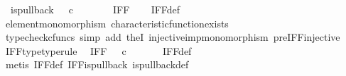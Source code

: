 \begin{isabellebody}
\ \ {\isachardoublequoteopen}is{\isacharunderscore}{\kern0pt}pullback\ {\isacharparenleft}{\kern0pt}{\isasymone}{\isasymCoprod}{\isasymone}{\isacharparenright}{\kern0pt}\ {\isasymone}\ {\isacharparenleft}{\kern0pt}{\isasymOmega}{\isasymtimes}\isactrlsub c{\isasymOmega}{\isacharparenright}{\kern0pt}\ {\isasymOmega}\ {\isacharparenleft}{\kern0pt}{\isasymbeta}\isactrlbsub {\isacharparenleft}{\kern0pt}{\isasymone}{\isasymCoprod}{\isasymone}{\isacharparenright}{\kern0pt}\isactrlesub {\isacharparenright}{\kern0pt}\ {\isasymt}\ {\isacharparenleft}{\kern0pt}{\isasymlangle}{\isasymt}{\isacharcomma}{\kern0pt}\ {\isasymt}{\isasymrangle}\ {\isasymamalg}{\isasymlangle}{\isasymf}{\isacharcomma}{\kern0pt}\ {\isasymf}{\isasymrangle}{\isacharparenright}{\kern0pt}\ IFF{\isachardoublequoteclose}\isanewline
%
\isadelimproof
\ \ %
\endisadelimproof
%
\isatagproof
{}\isamarkupfalse%
\ IFF{\isacharunderscore}{\kern0pt}def\isanewline
\ \ \isamarkupfalse%
\ element{\isacharunderscore}{\kern0pt}monomorphism\ characteristic{\isacharunderscore}{\kern0pt}function{\isacharunderscore}{\kern0pt}exists\isanewline
\ \ \isamarkupfalse%
\ {\isacharparenleft}{\kern0pt}typecheck{\isacharunderscore}{\kern0pt}cfuncs{\isacharcomma}{\kern0pt}\ simp\ add{\isacharcolon}{\kern0pt}\ the{}I{}\ injective{\isacharunderscore}{\kern0pt}imp{\isacharunderscore}{\kern0pt}monomorphism\ pre{\isacharunderscore}{\kern0pt}IFF{\isacharunderscore}{\kern0pt}injective{\isacharparenright}{\kern0pt}%
\endisatagproof
{\isafoldproof}%
%
\isadelimproof
\isanewline
%
\endisadelimproof
\isanewline
{}\isamarkupfalse%
\ IFF{\isacharunderscore}{\kern0pt}type{\isacharbrackleft}{\kern0pt}type{\isacharunderscore}{\kern0pt}rule{\isacharbrackright}{\kern0pt}{\isacharcolon}{\kern0pt}\isanewline
\ \ {\isachardoublequoteopen}IFF\ {\isacharcolon}{\kern0pt}\ {\isasymOmega}\ {\isasymtimes}\isactrlsub c\ {\isasymOmega}\ {\isasymrightarrow}\ {\isasymOmega}{\isachardoublequoteclose}\isanewline
%
\isadelimproof
\ \ %
\endisadelimproof
%
\isatagproof
{}\isamarkupfalse%
\ IFF{\isacharunderscore}{\kern0pt}def\isanewline
\ \ \isamarkupfalse%
\ {\isacharparenleft}{\kern0pt}metis\ IFF{\isacharunderscore}{\kern0pt}def\ IFF{\isacharunderscore}{\kern0pt}is{\isacharunderscore}{\kern0pt}pullback\ is{\isacharunderscore}{\kern0pt}pullback{\isacharunderscore}{\kern0pt}def{\isacharparenright}{\kern0pt}%
\endisatagproof
{\isafoldproof}%
%
\isadelimproof
\isanewline
%
\endisadelimproof
\isanewline
{}\isamarkupfalse%

\end{isabellebody}
